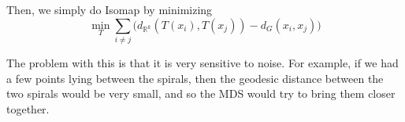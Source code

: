   \begin{definition}[Isomap] 
    Then, we simply do Isomap by minimizing 
    \begin{equation}
      \min_{T} \sum_{i \neq j} \big( d_{\mathbb{R}^k}(T(x_i), T(x_j)) - d_G(x_i, x_j) \big)
    \end{equation}
  \end{definition}

  The problem with this is that it is very sensitive to noise. For example, if we had a few points lying between the spirals, then the geodesic distance between the two spirals would be very small, and so the MDS would try to bring them closer together.  

  \begin{figure}[H]
    \centering
\end{figure}
